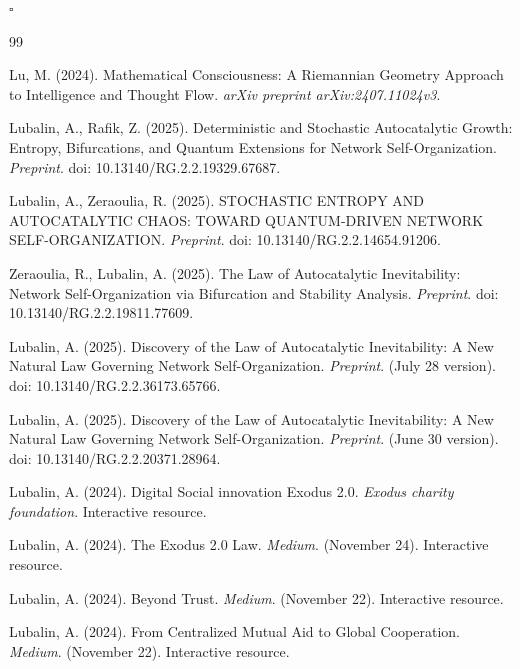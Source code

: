 \documentclass[11pt,a4paper]{article}
\theoremstyle{definition}
\theoremstyle{remark}
\begin{document}
\begin{small}
\begin{enumerate}
\begin{protocol}
\begin{center}
\vspace{2em}

\(\square\)
\end{center}


\begin{thebibliography}{99}

Lu, M. (2024). Mathematical Consciousness: A Riemannian Geometry Approach to Intelligence and Thought Flow. \textit{arXiv preprint arXiv:2407.11024v3}.

Lubalin, A., Rafik, Z. (2025). Deterministic and Stochastic Autocatalytic Growth: Entropy, Bifurcations, and Quantum Extensions for Network Self-Organization. \textit{Preprint}. doi: 10.13140/RG.2.2.19329.67687.

Lubalin, A., Zeraoulia, R. (2025). STOCHASTIC ENTROPY AND AUTOCATALYTIC CHAOS: TOWARD QUANTUM-DRIVEN NETWORK SELF-ORGANIZATION. \textit{Preprint}. doi: 10.13140/RG.2.2.14654.91206.

Zeraoulia, R., Lubalin, A. (2025). The Law of Autocatalytic Inevitability: Network Self-Organization via Bifurcation and Stability Analysis. \textit{Preprint}. doi: 10.13140/RG.2.2.19811.77609.

Lubalin, A. (2025). Discovery of the Law of Autocatalytic Inevitability: A New Natural Law Governing Network Self-Organization. \textit{Preprint}. (July 28 version). doi: 10.13140/RG.2.2.36173.65766.

Lubalin, A. (2025). Discovery of the Law of Autocatalytic Inevitability: A New Natural Law Governing Network Self-Organization. \textit{Preprint}. (June 30 version). doi: 10.13140/RG.2.2.20371.28964.

Lubalin, A. (2024). Digital Social innovation Exodus 2.0. \textit{Exodus charity foundation}. Interactive resource.

Lubalin, A. (2024). The Exodus 2.0 Law. \textit{Medium}. (November 24). Interactive resource.

Lubalin, A. (2024). Beyond Trust. \textit{Medium}. (November 22). Interactive resource.

Lubalin, A. (2024). From Centralized Mutual Aid to Global Cooperation. \textit{Medium}. (November 22). Interactive resource.


\end{thebibliography}
\end{protocol}
\end{enumerate}
\end{small}
\end{document}
